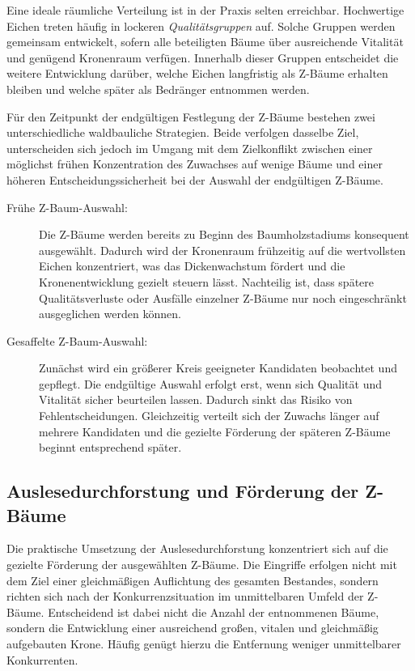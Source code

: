 \documentclass[twocolumn, bibliography=totoc, abstract=true]{scrartcl}
\begin{document}
Eine ideale räumliche Verteilung ist in der Praxis selten erreichbar. Hochwertige Eichen treten häufig in lockeren \emph{Qualitätsgruppen} auf. Solche Gruppen werden gemeinsam entwickelt, sofern alle beteiligten Bäume über ausreichende Vitalität und genügend Kronenraum verfügen. Innerhalb dieser Gruppen entscheidet die weitere Entwicklung darüber, welche Eichen langfristig als Z-Bäume erhalten bleiben und welche später als Bedränger entnommen werden.

Für den Zeitpunkt der endgültigen Festlegung der Z-Bäume bestehen zwei unterschiedliche waldbauliche Strategien. Beide verfolgen dasselbe Ziel, unterscheiden sich jedoch im Umgang mit dem Zielkonflikt zwischen einer möglichst frühen Konzentration des Zuwachses auf wenige Bäume und einer höheren Entscheidungssicherheit bei der Auswahl der endgültigen Z-Bäume.

\begin{description}
\item[Frühe Z-Baum-Auswahl:] Die Z-Bäume werden bereits zu Beginn des Baumholzstadiums konsequent ausgewählt. Dadurch wird der Kronenraum frühzeitig auf die wertvollsten Eichen konzentriert, was das Dickenwachstum fördert und die Kronenentwicklung gezielt steuern lässt. Nachteilig ist, dass spätere Qualitätsverluste oder Ausfälle einzelner Z-Bäume nur noch eingeschränkt ausgeglichen werden können.
\item[Gesaffelte Z-Baum-Auswahl:] Zunächst wird ein größerer Kreis geeigneter Kandidaten beobachtet und gepflegt. Die endgültige Auswahl erfolgt erst, wenn sich Qualität und Vitalität sicher beurteilen lassen. Dadurch sinkt das Risiko von Fehlentscheidungen. Gleichzeitig verteilt sich der Zuwachs länger auf mehrere Kandidaten und die gezielte Förderung der späteren Z-Bäume beginnt entsprechend später.
\end{description}

\subsection{Auslesedurchforstung und Förderung der Z-Bäume}

Die praktische Umsetzung der Auslesedurchforstung konzentriert sich auf die gezielte Förderung der ausgewählten Z-Bäume. Die Eingriffe erfolgen nicht mit dem Ziel einer gleichmäßigen Auflichtung des gesamten Bestandes, sondern richten sich nach der Konkurrenzsituation im unmittelbaren Umfeld der Z-Bäume. Entscheidend ist dabei nicht die Anzahl der entnommenen Bäume, sondern die Entwicklung einer ausreichend großen, vitalen und gleichmäßig aufgebauten Krone. Häufig genügt hierzu die Entfernung weniger unmittelbarer Konkurrenten.
\end{document}

